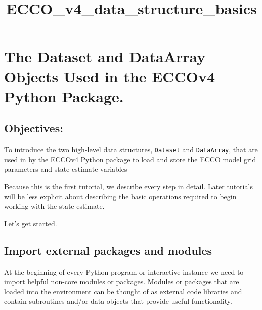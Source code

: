 \documentclass[11pt]{article}
\title{ECCO\_v4\_data\_structure\_basics}
\begin{document}
    
    
    \maketitle
    
    

    
    \section{The Dataset and DataArray Objects Used in the ECCOv4 Python
Package.}\label{the-dataset-and-dataarray-objects-used-in-the-eccov4-python-package.}

\subsection{Objectives:}\label{objectives}

To introduce the two high-level data structures, \texttt{Dataset} and
\texttt{DataArray}, that are used in by the ECCOv4 Python package to
load and store the ECCO model grid parameters and state estimate
variables

Because this is the first tutorial, we describe every step in detail.
Later tutorials will be less explicit about describing the basic
operations required to begin working with the state estimate.

Let's get started.

\subsection{Import external packages and
modules}\label{import-external-packages-and-modules}

At the beginning of every Python program or interactive instance we need
to import helpful non-core modules or packages. Modules or packages that
are loaded into the environment can be thought of as external code
libraries and contain subroutines and/or data objects that provide
useful functionality.
\end{document}
